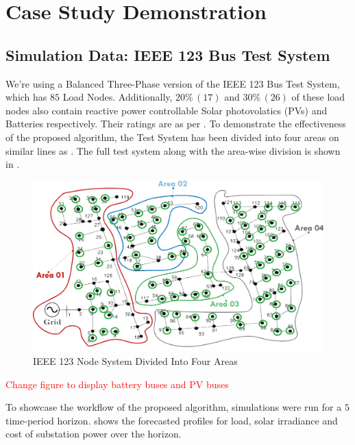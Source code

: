 \documentclass[../../outputs/main.tex]{subfiles}
\begin{document}
\section{Case Study Demonstration}

\subsection{Simulation Data: IEEE 123 Bus Test System}

We're using a Balanced Three-Phase version of the IEEE 123 Bus Test System, which has $85$ Load Nodes. Additionally, $20 \% \, (17)$ and $30 \% \, (26)$ of these load nodes also contain reactive power controllable Solar photovolatics (PVs) and Batteries respectively. Their ratings are as per . To demonstrate the effectiveness of the proposed algorithm, the Test System has been divided into four areas on similar lines as \cite{Sadnan}. The full test system along with the area-wise division is shown in .

\begin{figure}[h!]
    \centering
    \includegraphics[width=\linewidth]{../figures/ieee123-FourAreas.png}
    \caption{IEEE 123 Node System Divided Into Four Areas}
    \label{fig:ieee123-four-area-figure}
\end{figure}

\textcolor{red}{Change figure to display battery buses and PV buses}

To showcase the workflow of the proposed algorithm, simulations were run for a $5$ time-period horizon.  shows the forecasted profiles for load, solar irradiance and cost of substation power over the horizon. 
\end{document}
